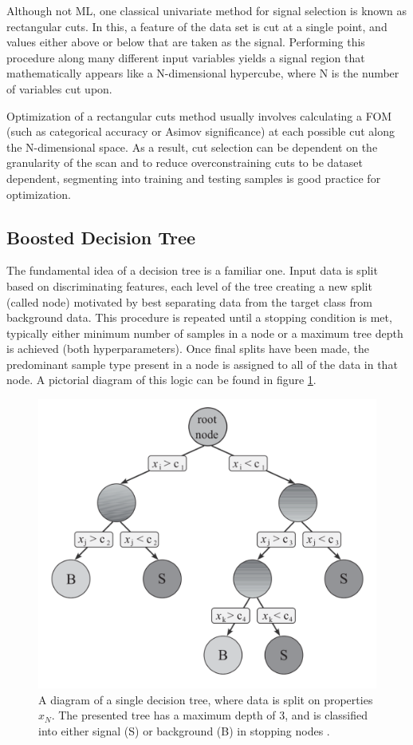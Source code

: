 Although not \gls{ML}, one classical univariate method for signal selection is known as rectangular cuts. In this, a feature of the data set is cut at a single point, and values either above or below that are taken as the signal. Performing this procedure along many different input variables yields a signal region that mathematically appears like a N-dimensional hypercube, where N is the number of variables cut upon. 

Optimization of a rectangular cuts method usually involves calculating a \gls{FOM} (such as categorical accuracy or Asimov significance) at each possible cut along the N-dimensional space. As a result, cut selection can be dependent on the granularity of the scan and to reduce overconstraining cuts to be dataset dependent, segmenting into training and testing samples is good practice for optimization.

\subsection{Boosted Decision Tree}

The fundamental idea of a decision tree is a familiar one. Input data is split based on discriminating features, each level of the tree creating a new split (called node) motivated by best separating data from the target class from background data. This procedure is repeated until a stopping condition is met, typically either minimum number of samples in a node or a maximum tree depth is achieved (both hyperparameters). Once final splits have been made, the predominant sample type present in a node is assigned to all of the data in that node. A pictorial diagram of this logic can be found in figure \ref{fig:bdt}.

\begin{figure}[!ht] 
    \centering
    \includegraphics[width=.7\textwidth]{appendices/images/bdt.png}
    \caption[A diagram of a single decision tree]{A diagram of a single decision tree, where data is split on properties $x_N$. The presented tree has a maximum depth of 3, and is classified into either signal (S) or background (B) in stopping nodes \cite{data-analysis}.}
    \label{fig:bdt}
\end{figure}

